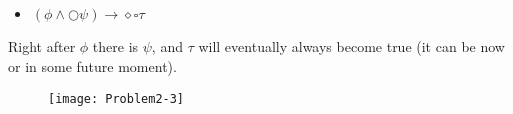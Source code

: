 \newpage
\subsection{}

\begin{itemize}
   \item[] $(\phi \land \bigcirc \psi) \rightarrow \diamond \square \tau$ 
\end{itemize}

\indent Right after $\phi$ there is $\psi$, and $\tau$ will eventually always become true (it can be now or in some future moment).

\begin{figure}[h!]
	\centering \texttt{[image: Problem2-3]}
\end{figure}